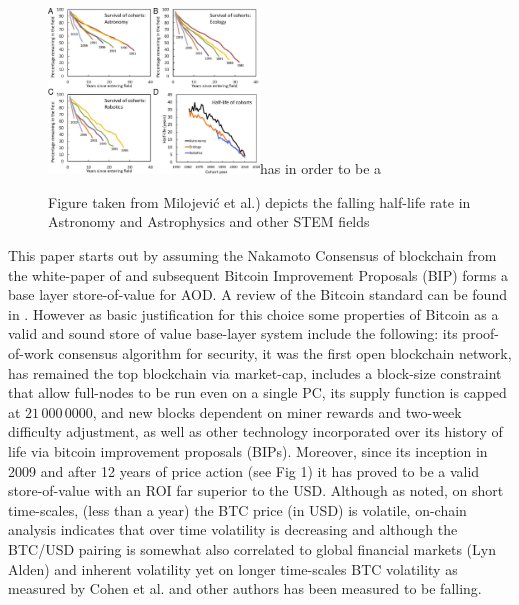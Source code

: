 \documentclass[final,5p,times,twocolumn,authoryear]{elsarticle}
\begin{document}
\begin{figure}[h!]
    \centering
    \label{fig:F4.large}
  \caption{Figure taken from Milojević et al.) depicts the falling half-life rate in Astronomy and Astrophysics and other STEM fields}
  \includegraphics[width=0.5\textwidth]{figs/F4.large.jpg}has in order to be a
\end{figure}
This paper starts out by assuming the Nakamoto Consensus of blockchain from the white-paper of \cite{nak2009} and subsequent Bitcoin Improvement Proposals (BIP) forms a base layer store-of-value for AOD. A review of the Bitcoin standard can be found in \citet{Hansen2020Book}. However as basic justification for this choice some properties of Bitcoin as a valid and sound store of value base-layer system include the following: its proof-of-work consensus algorithm for security, it was the first open blockchain network, has remained the top blockchain via market-cap, includes a block-size constraint that allow full-nodes to be run even on a single PC, its supply function is capped at $21\,000\,0000$, and new blocks dependent on miner rewards and two-week difficulty adjustment, as well as other technology incorporated over its history of life via bitcoin improvement proposals (BIPs). Moreover, since its inception in 2009 and after 12 years of price action (see Fig 1) it has proved to be a valid store-of-value with an ROI far superior to the USD. Although as noted, on short time-scales, (less than a year) the BTC price (in USD) is volatile, on-chain analysis indicates that over time volatility is decreasing and although the BTC/USD pairing is somewhat also correlated to global financial markets (Lyn Alden) and inherent volatility yet on longer time-scales BTC volatility as measured by Cohen et al. and other authors has been measured to be falling. 
\end{document}
